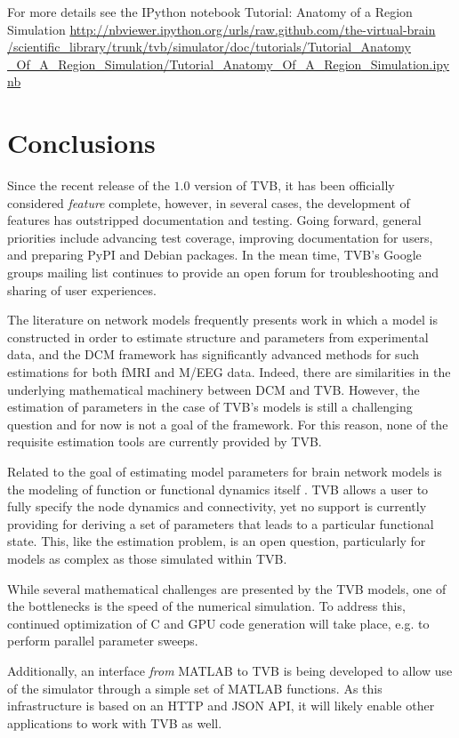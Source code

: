 \documentclass{bioinfo}
\begin{document}
For more details see the IPython notebook Tutorial: Anatomy of a Region Simulation 
\url{http://nbviewer.ipython.org/urls/raw.github.com/the-virtual-brain
/scientific_library/trunk/tvb/simulator/doc/tutorials/Tutorial_Anatomy
_Of_A_Region_Simulation/Tutorial_Anatomy_Of_A_Region_Simulation.ipynb}

\section{Conclusions}

Since the recent release of the $1.0$ version of TVB, it has been 
officially considered \textit{feature} complete, however, in several
cases, the development of features has outstripped documentation 
and testing. Going forward, general priorities include
advancing test coverage, improving documentation for users, and
preparing PyPI and Debian packages. In the mean
time, TVB's Google groups mailing list continues to
provide an open forum for troubleshooting and sharing of user experiences.

The literature on network models frequently presents work in which a model
is constructed in order to estimate structure and parameters from 
experimental data, and the DCM framework has significantly advanced 
methods for such estimations for both fMRI and M/EEG data. Indeed, there
are similarities in the underlying mathematical machinery between DCM and 
TVB. However, the estimation of parameters in the case of TVB's models
is still a challenging question and for now is not a goal of the framework. 
For this reason, none of the requisite estimation tools are currently 
provided by TVB.

Related to the goal of estimating model parameters for brain network models
is the modeling of function or functional dynamics itself 
\citep{erlhagen2002dynamic, eliasmith2012large}. TVB allows a user
to fully specify the node dynamics and connectivity, yet no support
is currently providing for deriving a set of parameters that leads to 
a particular functional state. This, like the estimation problem, is 
an open question, particularly for models as complex as those simulated 
within TVB.

While several mathematical challenges are presented by the TVB models, 
one of the bottlenecks is the speed of the numerical simulation.
To address this, continued optimization of C and GPU code generation
will take place, e.g. to perform parallel parameter sweeps. 

Additionally, an interface \textit{from} MATLAB to TVB 
is being developed to allow use of the simulator through a simple
set of MATLAB functions. As this infrastructure is based on an HTTP and 
JSON API, it will likely enable other applications to work with TVB as well.
\end{document}
